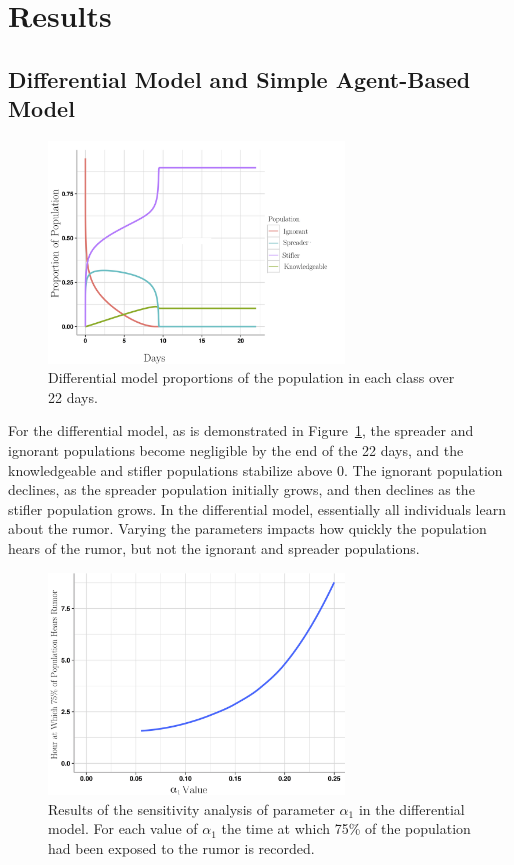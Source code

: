 \section{Results }
\label{sec:results}

\subsection{Differential Model and Simple Agent-Based Model}
\label{subsec:basicmod}

\begin{figure}[H]
\captionsetup{width=0.6\textwidth}
\centering
    \includegraphics[width=0.7\textwidth]{figures/figure1}
  \caption{ Differential model proportions of the population in each class over 22 days.}
\label{fig:figure1}
\end{figure}

For the differential model, as is demonstrated in Figure~\ref{fig:figure1}, the spreader and ignorant populations become negligible by the end of the 22 days, and the knowledgeable and stifler populations stabilize above 0.
The ignorant population declines, as the spreader population initially grows, and then declines as the stifler population grows.
In the differential model, essentially all individuals learn about the rumor.
Varying the parameters impacts how quickly the population hears of the rumor, but not the ignorant and spreader populations.

\begin{figure}[H]
\captionsetup{width=0.8\textwidth}
\centering
    \includegraphics[width=0.7\textwidth]{figures/figure2}
  \caption{ Results of the sensitivity analysis of parameter $ \alpha_1 $ in the differential model.
For each value of $ \alpha_1 $ the time at which 75\% of the population had been exposed to the rumor is recorded.}
\label{fig:figure2}
\end{figure}

